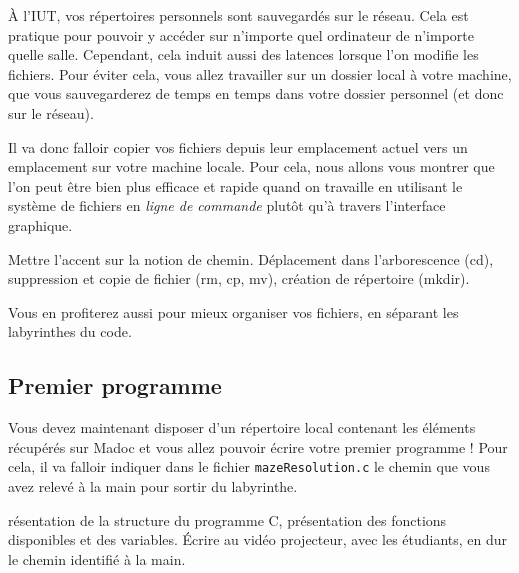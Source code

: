 \documentclass[a4paper]{article}
\newenvironment{enseignants}[1]{\noindent\color{blue}{\bf #1}}{}
\begin{document}
À l'IUT, vos répertoires personnels sont sauvegardés sur le réseau. Cela est pratique pour pouvoir y accéder sur n'importe quel ordinateur de n'importe quelle salle. Cependant, cela induit aussi des latences lorsque l'on modifie les fichiers.
Pour éviter cela, vous allez travailler sur un dossier local à votre machine, que vous sauvegarderez de temps en temps dans votre dossier personnel (et donc sur le réseau).

Il va donc falloir copier vos fichiers depuis leur emplacement actuel vers un emplacement sur votre machine locale. Pour cela, nous allons vous montrer que l’on peut être bien plus efficace et rapide quand on travaille en utilisant le système de fichiers en \emph{ligne de commande} plutôt qu'à travers l’interface graphique.

\begin{enseignants}{Système de fichiers~:}
  Mettre l'accent sur la notion de chemin.
  Déplacement dans l’arborescence (cd), suppression et copie de fichier (rm, cp, mv), création de répertoire (mkdir).
\end{enseignants}

Vous en profiterez aussi pour mieux organiser vos fichiers, en séparant les labyrinthes du code.

\subsection{Premier programme}

Vous devez maintenant disposer d’un répertoire local contenant les éléments récupérés sur Madoc et vous allez pouvoir écrire votre premier programme !
Pour cela, il va falloir indiquer dans le fichier \texttt{mazeResolution.c} le chemin que vous avez relevé à la main pour sortir du labyrinthe.

\begin{enseignants}
  Présentation de la structure du programme C, présentation des fonctions disponibles et des variables. Écrire au vidéo projecteur, avec les étudiants, en dur le chemin identifié à la main.
\end{enseignants}


\end{document}
